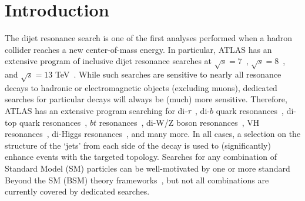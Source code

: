 
\section{Introduction}
\label{sec:CWoLa:intro}

The dijet resonance search is one of the first analyses performed when a hadron collider reaches a new center-of-mass energy.   In particular, ATLAS has an extensive program of inclusive dijet resonance searches at $\sqrt{s}=7$~\cite{Aad:2010ae,Aad:2011aj,Aad:2011fq}, $\sqrt{s}=8$~\cite{Aad:2014aqa}, and $\sqrt{s}=13$ TeV~\cite{ATLAS:2015nsi,Aaboud:2017yvp,Aaboud:2018fzt}.  While such searches are sensitive to nearly all resonance decays to hadronic or electromagnetic objects (excluding muons), dedicated searches for particular decays will always be (much) more sensitive.  Therefore, ATLAS has an extensive program searching for di-$\tau$~\cite{Aaboud:2016cre,Aaboud:2017sjh}, di-$b$ quark resonances~\cite{Aaboud:2016nbq,Aaboud:2018tqo}, di-top quark resonances~\cite{Aaboud:2018mjh}, $bt$ resonances~\cite{Aaboud:2018juj}, di-W/Z boson resonances~\cite{Aaboud:2016okv,Aaboud:2017fgj,Aaboud:2017itg,Aaboud:2017eta}, VH resonances~\cite{Aaboud:2018eoy,Aaboud:2017cxo,Aaboud:2017ahz}, di-Higgs resonances~\cite{Aaboud:2018knk}, and many more.  In all cases, a selection on the structure of the `jets' from each side of the decay is used to (significantly) enhance events with the targeted topology.  Searches for any combination of Standard Model (SM) particles can be well-motivated by one or more standard Beyond the SM (BSM) theory frameworks~\cite{Craig:2016rqv,Kim:2019rhy,}, but not all combinations are currently covered by dedicated searches.

